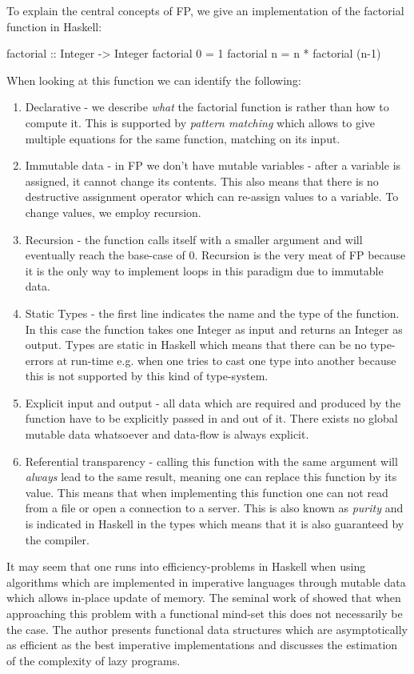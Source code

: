 To explain the central concepts of FP, we give an implementation of the factorial function in Haskell:
\begin{HaskellCode}
factorial :: Integer -> Integer
factorial 0 = 1
factorial n = n * factorial (n-1)
\end{HaskellCode}

When looking at this function we can identify the following: 
\begin{enumerate}
	\item Declarative - we describe \textit{what} the factorial function is rather than how to compute it. This is supported by \textit{pattern matching} which allows to give multiple equations for the same function, matching on its input. 
	\item Immutable data - in FP we don't have mutable variables - after a variable is assigned, it cannot change its contents. This also means that there is no destructive assignment operator which can re-assign values to a variable. To change values, we employ recursion.
	\item Recursion - the function calls itself with a smaller argument and will eventually reach the base-case of 0. Recursion is the very meat of FP because it is the only way to implement loops in this paradigm due to immutable data.
	\item Static Types - the first line indicates the name and the type of the function. In this case the function takes one Integer as input and returns an Integer as output. Types are static in Haskell which means that there can be no type-errors at run-time e.g. when one tries to cast one type into another because this is not supported by this kind of type-system.
	\item Explicit input and output - all data which are required and produced by the function have to be explicitly passed in and out of it. There exists no global mutable data whatsoever and data-flow is always explicit.
	\item Referential transparency - calling this function with the same argument will \textit{always} lead to the same result, meaning one can replace this function by its value. This means that when implementing this function one can not read from a file or open a connection to a server. This is also known as \textit{purity} and is indicated in Haskell in the types which means that it is also guaranteed by the compiler.
\end{enumerate}

It may seem that one runs into efficiency-problems in Haskell when using algorithms which are implemented in imperative languages through mutable data which allows in-place update of memory. The seminal work of \cite{okasaki_purely_1999} showed that when approaching this problem with a functional mind-set this does not necessarily be the case. The author presents functional data structures which are asymptotically as efficient as the best imperative implementations and discusses the estimation of the complexity of lazy programs.

